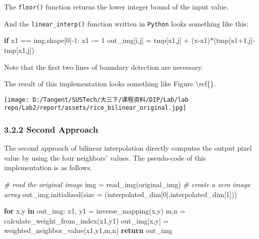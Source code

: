 \documentclass[
]{article}
\newenvironment{Shaded}{}{}
\newcommand{\CommentTok}[1]{\textcolor[rgb]{0.38,0.63,0.69}{\textit{#1}}}
\newcommand{\ControlFlowTok}[1]{\textcolor[rgb]{0.00,0.44,0.13}{\textbf{#1}}}
\newcommand{\DecValTok}[1]{\textcolor[rgb]{0.25,0.63,0.44}{#1}}
\newcommand{\KeywordTok}[1]{\textcolor[rgb]{0.00,0.44,0.13}{\textbf{#1}}}
\newcommand{\NormalTok}[1]{#1}
\newcommand{\OperatorTok}[1]{\textcolor[rgb]{0.40,0.40,0.40}{#1}}
\begin{document}
The \texttt{floor()} function returns the lower integer bound of the
input value.

And the \texttt{linear\_interp()} function written in \texttt{Python}
looks something like this:

\begin{Shaded}
\begin{Highlighting}[]
\ControlFlowTok{if}\NormalTok{ x1 }\OperatorTok{==}\NormalTok{ img.shape[}\DecValTok{0}\NormalTok{]}\OperatorTok{{-}}\DecValTok{1}\NormalTok{:}
\NormalTok{    x1 }\OperatorTok{{-}=} \DecValTok{1}
\NormalTok{out\_img[i,j] }\OperatorTok{=}\NormalTok{ tmp[x1,j] }\OperatorTok{+}\NormalTok{ (x}\OperatorTok{{-}}\NormalTok{x1)}\OperatorTok{*}\NormalTok{(tmp[x1}\OperatorTok{+}\DecValTok{1}\NormalTok{,j]}\OperatorTok{{-}}\NormalTok{tmp[x1,j])}
\end{Highlighting}
\end{Shaded}

Note that the first two lines of boundary detection are necessary.

The result of this implementation looks something like Figure
\textbackslash ref\{\}.

\texttt{[image: D:/Tangent/SUSTech/大三下/课程资料/DIP/Lab/lab repo/Lab2/report/assets/rice\_bilinear\_original.jpg]}

\hypertarget{322-second-approach}{%
\subsubsection{3.2.2 Second Approach}\label{322-second-approach}}

The second approach of bilinear interpolation directly computes the
output pixel value by using the four neighbors' values. The pseudo-code
of this implementation is as follows.

\begin{Shaded}
\begin{Highlighting}[]
\CommentTok{\# read the original image}
\NormalTok{img }\OperatorTok{=}\NormalTok{ read\_img(original\_img)}
\CommentTok{\# create a zero image array}
\NormalTok{out\_img.initialized(size }\OperatorTok{=}\NormalTok{ (interpolated\_dim[}\DecValTok{0}\NormalTok{],interpolated\_dim[}\DecValTok{1}\NormalTok{]))}

\ControlFlowTok{for}\NormalTok{ x,y }\KeywordTok{in}\NormalTok{ out\_img:}
\NormalTok{    x1, y1 }\OperatorTok{=}\NormalTok{ inverse\_mapping(x,y)}
\NormalTok{    m,n }\OperatorTok{=}\NormalTok{ calculate\_weight\_from\_index(x1,y1)}
\NormalTok{    out\_img[x,y] }\OperatorTok{=}\NormalTok{ weighted\_neighbor\_value(x1,y1,m,n)}
\ControlFlowTok{return}\NormalTok{ out\_img}
\end{Highlighting}
\end{Shaded}
\end{document}

